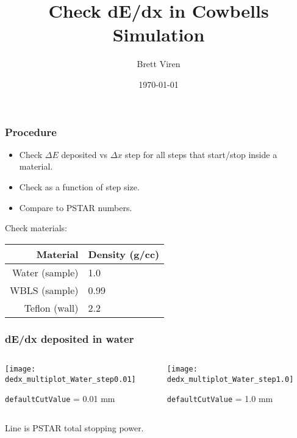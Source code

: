 \documentclass[]{beamer}
\title[dedx]{Check dE/dx in Cowbells Simulation}
\author{Brett Viren}
\date{\today}
\begin{document}
\maketitle


\begin{frame}
  \frametitle{Procedure}
  \begin{itemize}
  \item Check $\Delta E$ deposited vs $\Delta x$ step for all steps
    that start/stop inside a material.
  \item Check as a function of step size.
  \item Compare to PSTAR numbers.
  \end{itemize}

  Check materials:
  \begin{center}
    \begin{tabular}[h]{|r|l|}
      Material & Density (g/cc) \\
      \hline
      Water (sample) & 1.0 \\
      WBLS (sample) & 0.99 \\
      Teflon (wall) & 2.2 \\
    \end{tabular}
  \end{center}

\end{frame}

\begin{frame}[fragile]
  \frametitle{dE/dx deposited in water}
  \begin{columns}
    \begin{column}{0.5\paperwidth}
      \texttt{[image: dedx\_multiplot\_Water\_step0.01]}

      \begin{center}
        \texttt{defaultCutValue} = 0.01 mm
      \end{center}
    \end{column}
    \begin{column}{0.5\paperwidth}
      \texttt{[image: dedx\_multiplot\_Water\_step1.0]}      

      \begin{center}
        \texttt{defaultCutValue} = 1.0 mm
      \end{center}
    \end{column}
  \end{columns}
  
  \begin{center}
    Line is PSTAR total stopping power.
  \end{center}
\end{frame}
\end{document}
